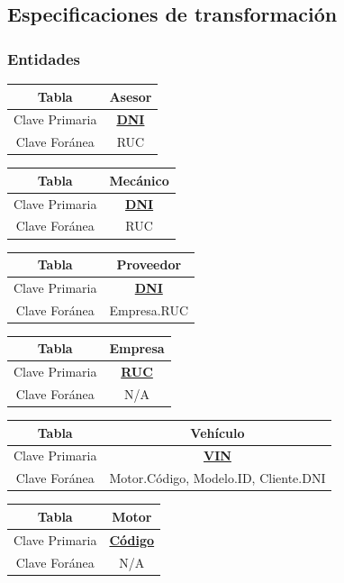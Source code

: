 \documentclass[12pt]{article}
\begin{document}
\subsection{Especificaciones de transformaci\'on}

\subsubsection{Entidades}

\begin{tabular}{|c|c|}
\hline
Tabla & Asesor \\
\hline
Clave Primaria & \textbf{\underline{DNI}} \\
\hline
Clave Foránea & RUC \\
\hline
\end{tabular}

\begin{tabular}{|c|c|}
\hline
Tabla & Mecánico \\
\hline
Clave Primaria & \textbf{\underline{DNI}} \\
\hline
Clave Foránea & RUC \\
\hline
\end{tabular}

\begin{tabular}{|c|c|}
\hline
Tabla & Proveedor \\
\hline
Clave Primaria & \textbf{\underline{DNI}} \\
\hline
Clave Foránea & Empresa.RUC \\
\hline
\end{tabular}

\begin{tabular}{|c|c|}
\hline
Tabla & Empresa \\
\hline
Clave Primaria & \textbf{\underline{RUC}} \\
\hline
Clave Foránea & N/A \\
\hline
\end{tabular}



\begin{tabular}{|c|c|}
\hline
Tabla & Vehículo \\
\hline
Clave Primaria & \textbf{\underline{VIN}} \\
\hline
Clave Foránea & Motor.Código, Modelo.ID, Cliente.DNI \\
\hline
\end{tabular}

\begin{tabular}{|c|c|}
\hline
Tabla & Motor \\
\hline
Clave Primaria & \textbf{\underline{Código}} \\
\hline
Clave Foránea & N/A \\
\hline
\end{tabular}
\end{document}
